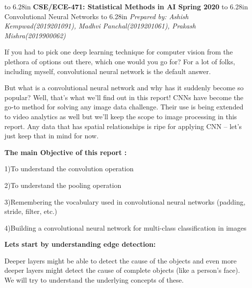 \documentclass[a4paper]{article}
\begin{document}

\pagestyle{myheadings}
   \thispagestyle{plain}
   \newpage
   \noindent
   \begin{center}
   \framebox
   {
      \vbox{\vspace{2mm}
        \hbox to 6.28in { {\bf CSE/ECE-471: Statistical Methods in AI
	    \hfill Spring 2020} }
      \vspace{4mm}
        \hbox to 6.28in { {\Large \hfill Convolutional Neural Networks \hfill} } %
        \vspace{2mm}
        \hbox to 6.28in { {\it Prepared by:  Ashish Kempwad(2019201091), Madhvi Panchal(2019201061), Prakash Mishra(2019900062) \hfill} } %
        \vspace{2mm}}
   }
   \end{center}



If you had to pick one deep learning technique for computer vision from the plethora of options out there, which one would you go for? For a lot of folks, including myself, convolutional neural network is the default answer.

But what is a convolutional neural network and why has it suddenly become so popular? Well, that’s what we’ll find out in this report! CNNs have become the go-to method for solving any image data challenge. Their use is being extended to video analytics as well but we’ll keep the scope to image processing in this report. Any data that has spatial relationships is ripe for applying CNN – let’s just keep that in mind for now. 

\textbf{The main Objective of this report :}

    1)To understand the convolution operation
    
    2)To understand the pooling operation
    
    3)Remembering the vocabulary used in convolutional neural networks         
     (padding, stride, filter, etc.)
    
    4)Building a convolutional neural network for multi-class classification in images
    
    
   \textbf{ Lets start by understanding edge detection:}
    
 Deeper layers might be able to detect the cause of the objects and even more deeper layers might detect the cause of complete objects (like a person’s face). We will try to understand the underlying concepts of these.
 
\end{document}
